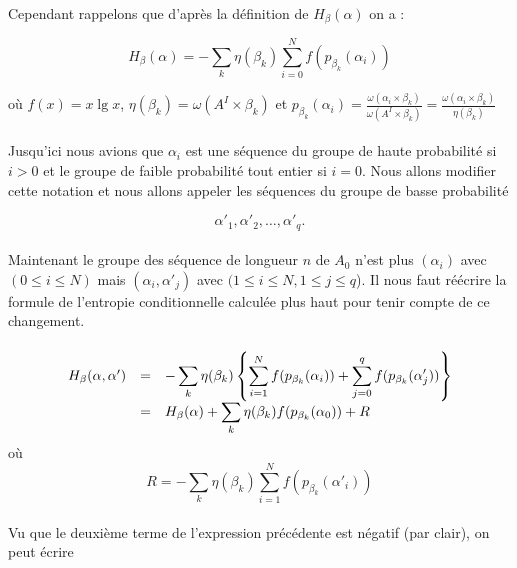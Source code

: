 	\paragraph{}
	Cependant rappelons que d'après la définition de $H_\beta(\alpha)$ on a :
	
	\[
		H_\beta(\alpha) = 
		- \sum_k\eta(\beta_k)\sum_{i=0}^Nf(p_{\beta_k}(\alpha_i))
	\]
	
	où $f(x) = x \lg x$, $\eta(\beta_k) = \omega(A^I \times \beta_k)$ 
	et 
		$p_{\beta_k}(\alpha_i) = 
		\frac{\omega(\alpha_i \times \beta_k)}{\omega(A^I \times \beta_k)}=
		\frac{\omega(\alpha_i \times \beta_k)}{\eta(\beta_k)}$	
	
	\paragraph{}
	Jusqu'ici nous avions que $\alpha_i$ est une séquence du groupe de haute 
	probabilité si $i>0$ et le groupe de faible probabilité tout entier si 
	$i=0$. Nous allons modifier cette notation et nous allons appeler les 
	séquences du groupe de basse probabilité 
	
	\[\alpha'_1, \alpha'_2, \dots, \alpha'_q.\]
	
	\paragraph{}
	Maintenant le groupe des séquence de longueur $n$ de $A_0$ n'est plus 
	$(\alpha_i)$ avec $(0 \le i \le N)$ mais $(\alpha_i, \alpha'_j)$ avec 
	$(1\le i \le N, 1 \le j \le q$). Il nous faut réécrire la formule de
	 l'entropie conditionnelle calculée plus haut pour tenir compte de ce
	 changement.
	
	\paragraph{}
	\[
		\begin{array}{r c >{\displaystyle}l}
			H_\beta(\alpha,\alpha') &=& 
				- \sum_k\eta(\beta_k)\left\{
					\sum_{i=1}^Nf(p_{\beta_k}(\alpha_i))+
					\sum_{j=0}^qf(p_{\beta_k}(\alpha'_j))
				\right\}\\
			&=& H_\beta(\alpha) + 
				\sum_k\eta(\beta_k)f(p_{\beta_k}(\alpha_0))+R
		\end{array}
	\]
	où
	\[R=- \sum_k\eta(\beta_k)\sum_{i=1}^Nf(p_{\beta_k}(\alpha'_i))\]
	
	\paragraph{}
	Vu que le deuxième terme de l'expression précédente est négatif 
	(par clair), on peut écrire
	
